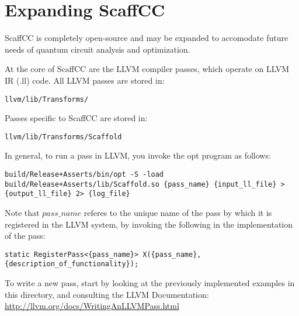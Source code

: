 \chapter{Expanding ScaffCC}\label{ch:expand}

ScaffCC is completely open-source and may be expanded to accomodate future needs of quantum circuit analysis and optimization.


At the core of ScaffCC are the LLVM compiler passes, which operate on LLVM IR (.ll) code. All LLVM passes are stored in:
\begin{lstlisting}
llvm/lib/Transforms/
\end{lstlisting}

Passes specific to ScaffCC are stored in:
\begin{lstlisting}
llvm/lib/Transforms/Scaffold
\end{lstlisting}

In general, to run a pass in LLVM, you invoke the opt program as follows:
\begin{lstlisting}
build/Release+Asserts/bin/opt -S -load build/Release+Asserts/lib/Scaffold.so {pass_name} {input_ll_file} > {output_ll_file} 2> {log_file}
\end{lstlisting}

Note that ${pass\_name}$ referes to the unique name of the pass by which it is registered in the LLVM system, by invoking the following in the implementation of the pass:
\begin{lstlisting}
static RegisterPass<{pass_name}> X({pass_name}, {description_of_functionality});
\end{lstlisting}

To write a new pass, start by looking at the previously implemented examples in this directory, and consulting the LLVM Documentation:
\url{http://llvm.org/docs/WritingAnLLVMPass.html}
